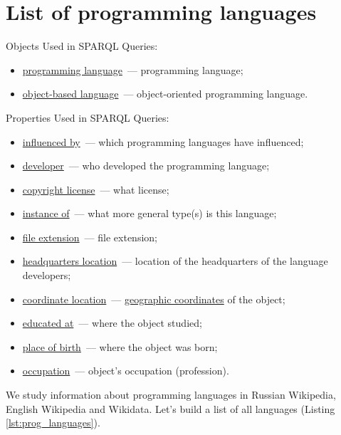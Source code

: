 \section{List of programming languages}
Objects Used in SPARQL Queries:
\begin{itemize}
	\item\href{https://www.wikidata.org/wiki/Q9143}{programming language}~--- programming language;
	\item\href{https://www.wikidata.org/wiki/Q899523}{object-based language}~--- object-oriented programming language.
\end{itemize}
Properties Used in SPARQL Queries:
\begin{itemize}
	\item\href{https://www.wikidata.org/wiki/Property:P737}{influenced by}~--- which programming languages have influenced;
	\item\href{https://www.wikidata.org/wiki/Property:P178}{developer}~--- who developed the programming language;
	\item\href{https://www.wikidata.org/wiki/Property:P275}{copyright license}~--- what license;
	\item\href{https://www.wikidata.org/wiki/Property:P31}{instance of}~--- what more general type(s) is this language;
	\item\href{https://www.wikidata.org/wiki/Property:P1195}{file extension}~--- file extension;
	\item\href{https://www.wikidata.org/wiki/Property:P159}{headquarters location}~---  location of the headquarters of the language developers;
	\item\href{https://www.wikidata.org/wiki/Property:P625}{coordinate location}~--- \href{https://en.wikipedia.org/wiki/Geographic_coordinate_system}{geographic coordinates} of the object;
	\item\href{https://www.wikidata.org/wiki/Property:P69}{educated at}~--- where the object studied;
	\item\href{https://www.wikidata.org/wiki/Property:P19}{place of birth}~--- where the object was born;
	\item\href{https://www.wikidata.org/wiki/Property:P106}{occupation}~--- object's occupation (profession).
\end{itemize}
We study information about programming languages in Russian Wikipedia, English Wikipedia and Wikidata. Let's build a list of all languages (Listing \ref{lst:prog_languages}).
